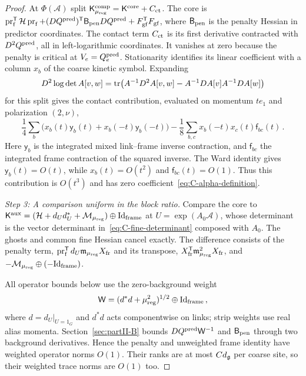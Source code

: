 \begin{proof}
At $\Phi(\mathcal A)$ split $\mathsf K^{\rm comp}_{\mu_{\rm reg}}=\mathsf K^{\rm core}+C_{\rm ct}$. The core is $\operatorname{pr}_{\rm f}^{\mathsf T}\mathcal H\operatorname{pr}_{\rm f}+(DQ^{\rm pred})^{\mathsf T}\mathsf B_{\rm pen}DQ^{\rm pred}+F_{\rm gf}^{\mathsf T}F_{\rm gf}$, where $\mathsf B_{\rm pen}$ is the penalty Hessian in predictor coordinates. The contact term $C_{\rm ct}$ is its first derivative contracted with $D^2Q^{\rm pred}$, all in left-logarithmic coordinates. It vanishes at zero because the penalty is critical at $V_e=Q_e^{\rm pred}$. Stationarity identifies its linear coefficient with a column $x_b$ of the coarse kinetic symbol. Expanding
\begin{equation}\label{eq:C-logdet-variation}
 D^2\log\det A[v,w]=\operatorname{tr}\bigl(A^{-1}D^2A[v,w]-A^{-1}DA[v]A^{-1}DA[w]\bigr)
\end{equation}
for this split gives the contact contribution, evaluated on momentum $te_1$ and polarization $(2,\nu)$,
\begin{equation*}
 \frac14\sum_b\bigl(x_b(t)\mathsf y_b(t)+x_b(-t)\mathsf y_b(-t)\bigr)
 -\frac18\sum_{b,c}x_b(-t)x_c(t)\mathsf f_{bc}(t)\,.
\end{equation*}
Here $\mathsf y_b$ is the integrated mixed link--frame inverse contraction, and $\mathsf f_{bc}$ the integrated frame contraction of the squared inverse. The Ward identity gives $\mathsf y_b(t)=O(t)$, while $x_b(t)=O(t^2)$ and $\mathsf f_{bc}(t)=O(1)$. Thus this contribution is $O(t^3)$ and has zero coefficient~\eqref{eq:C-alpha-definition}.

\emph{Step 3: A comparison uniform in the block ratio.}
Compare the core to $\mathsf K^{\rm aux}=(\mathcal H+d_Ud_U^*+\mathcal M_{\mu_{\rm reg}})\oplus\mathrm{Id}_{\rm frame}$ at $U=\exp(A_0\mathcal A)$, whose determinant is the vector determinant in~\eqref{eq:C-fine-determinant} composed with $A_0$. The ghosts and common fine Hessian cancel exactly. The difference consists of the penalty term, $\operatorname{pr}_{\rm f}^{\mathsf T}d_U\mathfrak m_{\mu_{\rm reg}}X_{\rm fr}$ and its transpose, $X_{\rm fr}^{\mathsf T}\mathfrak m_{\mu_{\rm reg}}^2X_{\rm fr}$, and $-\mathcal M_{\mu_{\rm reg}}\oplus(-\mathrm{Id}_{\rm frame})$.

All operator bounds below use the zero-background weight
\begin{equation}\label{eq:C-operator-weight}
 \mathsf W=(d^*d+\mu_{\rm reg}^2)^{1/2}\oplus\mathrm{Id}_{\rm frame}\,,
\end{equation}
where $d=d_U|_{U=1_G}$ and $d^*d$ acts componentwise on links; strip weights use real alias momenta. Section~\ref{sec:partII-B} bounds $DQ^{\rm pred}\mathsf W^{-1}$ and $\mathsf B_{\rm pen}$ through two background derivatives. Hence the penalty and unweighted frame identity have weighted operator norms $O(1)$. Their ranks are at most $Cd_{\mathfrak{g}}$ per coarse site, so their weighted trace norms are $O(1)$ too.


\end{proof}
